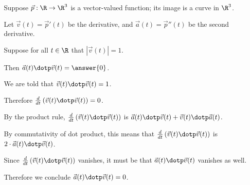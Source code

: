 \documentclass{ximera}
\author{Jim Fowler}
\begin{document}
\begin{exercise}

  Suppose $\vec{p} : \R \to \R^3$ is a vector-valued function; its image is a curve in $\R^3$.

  Let $\vec{v}(t) = \vec{p}'(t)$ be the derivative, and $\vec{a}(t) = \vec{p}''(t)$ be the second derivative.

  Suppose for all $t \in \R$ that $|\vec{v}(t)| = 1$.

  Then $\vec{a}(t) \dotp \vec{v}(t) = \answer{0}$.

  \begin{hint}
    We are told that $\vec{v}(t) \dotp \vec{v}(t) = 1$.
  \end{hint}

  \begin{hint}
    Therefore $\frac{d}{dt} \left( \vec{v}(t) \dotp \vec{v}(t) \right) = 0$.
  \end{hint}

  \begin{hint}
    By the product rule, $\frac{d}{dt} \left( \vec{v}(t) \dotp \vec{v}(t) \right)$ is $\vec{a}(t) \dotp \vec{v}(t) + \vec{v}(t) \dotp \vec{a}(t)$.
  \end{hint}

  \begin{hint}
    By commutativity of dot product, this means that $\frac{d}{dt} \left( \vec{v}(t) \dotp \vec{v}(t) \right)$ is $2 \cdot \vec{a}(t) \dotp \vec{v}(t)$.
  \end{hint}

  \begin{hint}
    Since $\frac{d}{dt} \left( \vec{v}(t) \dotp \vec{v}(t) \right)$ vanishes, it must be that $\vec{a}(t) \dotp \vec{v}(t)$ vanishes as well.
  \end{hint}

  \begin{hint}
    Therefore we conclude $\vec{a}(t) \dotp \vec{v}(t) = 0$.
  \end{hint}  
  
\end{exercise}
\end{document}
